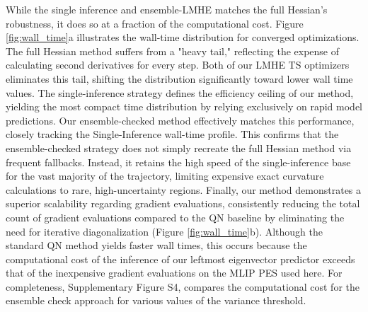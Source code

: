 \documentclass[12pt]{article}
\begin{document}
While the single inference and ensemble-LMHE matches the full Hessian's robustness, it does so at a fraction of the computational cost. Figure \ref{fig:wall_time}a illustrates the wall-time distribution for converged optimizations. The full Hessian method suffers from a "heavy tail," reflecting the expense of calculating second derivatives for every step. Both of our LMHE TS optimizers eliminates this tail, shifting the distribution significantly toward lower wall time values. The single-inference strategy defines the efficiency ceiling of our method, yielding the most compact time distribution by relying exclusively on rapid model predictions. Our ensemble-checked method effectively matches this performance, closely tracking the Single-Inference wall-time profile. This confirms that the ensemble-checked strategy does not simply recreate the full Hessian method via frequent fallbacks. Instead, it retains the high speed of the single-inference base for the vast majority of the trajectory, limiting expensive exact curvature calculations to rare, high-uncertainty regions. Finally, our method demonstrates a superior scalability regarding gradient evaluations, consistently reducing the total count of gradient evaluations compared to the QN baseline by eliminating the need for iterative diagonalization (Figure \ref{fig:wall_time}b). Although the standard QN method yields faster wall times, this occurs because the computational cost of the inference of our leftmost eigenvector predictor exceeds that of the inexpensive gradient evaluations on the MLIP PES used here. For completeness, Supplementary Figure S4, compares the computational cost for the ensemble check approach for various values of the variance threshold. 
\end{document}
